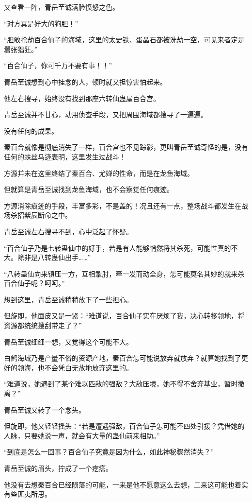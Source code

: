 \begin{this_body}
又查看一阵，青岳至诚满脸愤怒之色。

“对方真是好大的狗胆！”

“胆敢抢劫百合仙子的海域，这里的太史铁、蛋晶石都被洗劫一空，可见来者定是嚣张猖狂。”

“百合仙子，你可千万不要有事！！”

青岳至诚想到心中挂念的人，顿时就又担惊害怕起来。

他左右搜寻，始终没有找到那座六转仙蛊屋百合宫。

青岳至诚并不甘心，动用侦查手段，又把周围海域都搜寻了一遍遍。

没有任何的成果。

秦百合就像是彻底消失了一样，百合宫也不见踪影，更叫青岳至诚奇怪的是，没有任何的蛛丝马迹表明，这里发生过战斗！

方源并未在这里终结了秦百合、尤婵的性命，而是在龙鱼海域。

但就算是青岳至诚找到龙鱼海域，也不会察觉任何痕迹。

方源消除痕迹的手段，丰富多彩，不是盖的！况且还有一点，整场战斗都发生在战场杀招紫辰断命之中。

青岳至诚左右搜寻不到，心中泛起了怀疑。

“百合仙子乃是七转蛊仙中的好手，若是有人能够悄然将其杀死，可能性真的不大。除非是八转蛊仙出手……”

“八转蛊仙向来镇压一方，互相掣肘，牵一发而动全身，怎可能莫名其妙的就来杀百合仙子呢？呵呵。”

想到这里，青岳至诚稍稍放下了一些担心。

但旋即，他面皮又是一紧：“难道说，百合仙子实在厌烦了我，决心转移领地，将资源都统统搜刮带走了？”

青岳至诚细细一想，又觉得这个可能不大。

白鹤海域乃是产量不俗的资源产地，秦百合怎可能说放弃就放弃？就算她找到了更好的领海，也不会凭白无故地放弃这里的。

“难道说，她遇到了某个难以匹敌的强敌？大敌压境，她不得不舍弃基业，暂时撤离？”

青岳至诚又转了一个念头。

但旋即，他又轻轻摇头：“若是遭遇强敌，百合仙子怎可能不四处引援？凭借她的人脉，只要她说一声，就会有大量的蛊仙前来相助。”

“到底是怎么一回事？百合仙子究竟是因为什么，如此神秘骤然消失？”

青岳至诚的眉头，拧成了一个疙瘩。

他没有去想秦百合已经陨落的可能，一来是他不愿意这么去想，二来这可能也着实有些匪夷所思。


\end{this_body}

